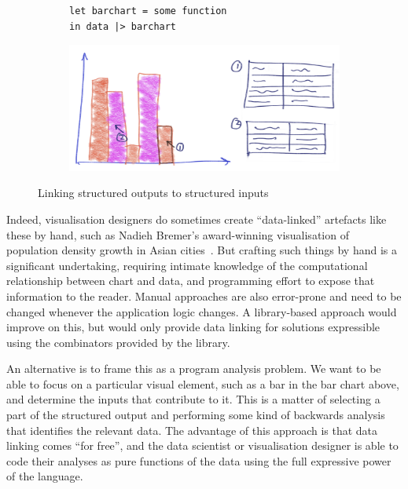 \begin{figure}[H]
   \begin{subfigure}{0.35\textwidth}
      \small
      \begin{lstlisting}
let barchart = some function
in data |> barchart
      \end{lstlisting}
   \end{subfigure}
   \begin{subfigure}{0.63\textwidth}
      {\includegraphics[scale=0.05]{fig/example/data-linking.png}}
   \end{subfigure}
   \caption{Linking structured outputs to structured inputs}
   \label{fig:introduction:data-linking}
\end{figure}

Indeed, visualisation designers do sometimes create ``data-linked'' artefacts like these by hand, such as Nadieh Bremer's award-winning visualisation of population density growth in Asian cities~\cite{bremer15}. But crafting such things by hand is a significant undertaking, requiring intimate knowledge of the computational relationship between chart and data, and programming effort to expose that information to the reader. Manual approaches are also error-prone and need to be changed whenever the application logic changes. A library-based approach would improve on this, but would only provide data linking for solutions expressible using the combinators provided by the library.

An alternative is to frame this as a program analysis problem. We want to be able to focus on a particular visual element, such as a bar in the bar chart above, and determine the inputs that contribute to it. This is a matter of selecting a part of the structured output and performing some kind of backwards analysis that identifies the relevant data. The advantage of this approach is that data linking comes ``for free'', and the data scientist or visualisation designer is able to code their analyses as pure functions of the data using the full expressive power of the language.


